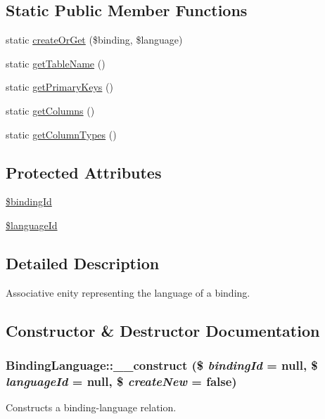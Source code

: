 \subsection*{Static Public Member Functions}
\begin{DoxyCompactItemize}
\item 
static \hyperlink{classBindingLanguage_a36d05494548bf935e2a19f7cf37237fc}{createOrGet} (\$binding, \$language)
\item 
static \hyperlink{classBindingLanguage_a0f5427a1846d14c04dee6c35c73a0781}{getTableName} ()
\item 
static \hyperlink{classBindingLanguage_aafc27da4c3edcd204cf51d2d2429e8eb}{getPrimaryKeys} ()
\item 
static \hyperlink{classBindingLanguage_a98dcffedcdfc0ebe0701353fd2d17d06}{getColumns} ()
\item 
static \hyperlink{classBindingLanguage_a2555fe5224b885813f810b249a0fbefb}{getColumnTypes} ()
\end{DoxyCompactItemize}
\subsection*{Protected Attributes}
\begin{DoxyCompactItemize}
\item 
\hyperlink{classBindingLanguage_a4f5a54f30fd269c6db9196dd20f3e9d1}{\$bindingId}
\item 
\hyperlink{classBindingLanguage_a06beffccd3823c174be9117bf3ea3d50}{\$languageId}
\end{DoxyCompactItemize}


\subsection{Detailed Description}
Associative enity representing the language of a binding. 

\subsection{Constructor \& Destructor Documentation}
\hypertarget{classBindingLanguage_a82d72a86b098f9d6ee3d11412f566674}{
\subsubsection[{\_\-\_\-construct}]{\setlength{\rightskip}{0pt plus 5cm}BindingLanguage::\_\-\_\-construct (\$ {\em bindingId} = {\ttfamily null}, \/  \$ {\em languageId} = {\ttfamily null}, \/  \$ {\em createNew} = {\ttfamily false})}}
\label{classBindingLanguage_a82d72a86b098f9d6ee3d11412f566674}
Constructs a binding-\/language relation.


